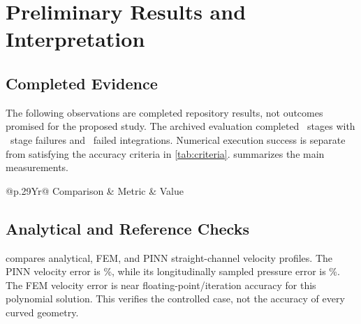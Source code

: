 \chapter{Preliminary Results and Interpretation}
\label{ch:preliminary}
\section{Completed Evidence}
The following observations are completed repository results, not outcomes
promised for the proposed study. The archived evaluation completed
\CompletedStages\ stages with \FailedStages\ stage failures and
\FailedIntegrations\ failed integrations. Numerical execution success is
separate from satisfying the accuracy criteria in \cref{tab:criteria}.
 summarizes the main measurements.

\begin{table}[!htbp]
\centering\small
\caption{Automatically extracted preliminary numerical evidence.}
\label{tab:summary}
\begin{tabularx}{\textwidth}{@{}p{}Yr@{}}
\toprule Comparison & Metric & Value\\\midrule
{}
\bottomrule
\end{tabularx}
\end{table}

\section{Analytical and Reference Checks}
 compares analytical, FEM, and PINN straight-channel
velocity profiles. The PINN velocity error is
\PoiseuilleVelocityPercent\%, while its longitudinally sampled pressure
error is \PoiseuillePressurePercent\%. The FEM velocity error is near
floating-point/iteration accuracy for this polynomial solution. This
verifies the controlled case, not the accuracy of every curved geometry.


